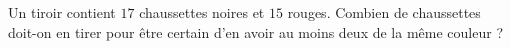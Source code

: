 
\begin{exercice}\label{exosmath-0191}

Un tiroir contient \( 17\) chaussettes noires et \( 15\) rouges. Combien de chaussettes doit-on en tirer pour être certain d'en avoir au moins deux de la même couleur ?

\end{exercice}

